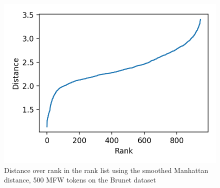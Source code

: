 \begin{figure}
  \centering
  \caption{Distance over rank in the rank list using the smoothed Manhattan distance, 500 MFW tokens on the Brunet dataset}
  \label{fig:distance_over_rank}
  \includegraphics[width=\linewidth]{img/distance_over_rank.png}
\end{figure}


